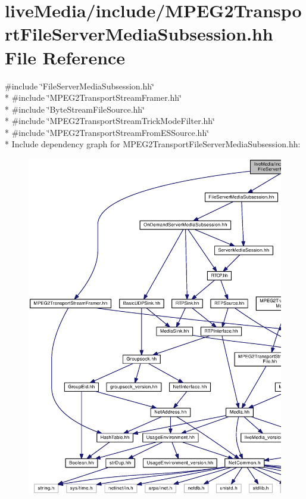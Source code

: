 \section{live\+Media/include/\+M\+P\+E\+G2\+Transport\+File\+Server\+Media\+Subsession.hh File Reference}
\label{MPEG2TransportFileServerMediaSubsession_8hh}
{\ttfamily \#include \char`\"{}File\+Server\+Media\+Subsession.\+hh\char`\"{}}\\*
{\ttfamily \#include \char`\"{}M\+P\+E\+G2\+Transport\+Stream\+Framer.\+hh\char`\"{}}\\*
{\ttfamily \#include \char`\"{}Byte\+Stream\+File\+Source.\+hh\char`\"{}}\\*
{\ttfamily \#include \char`\"{}M\+P\+E\+G2\+Transport\+Stream\+Trick\+Mode\+Filter.\+hh\char`\"{}}\\*
{\ttfamily \#include \char`\"{}M\+P\+E\+G2\+Transport\+Stream\+From\+E\+S\+Source.\+hh\char`\"{}}\\*
Include dependency graph for M\+P\+E\+G2\+Transport\+File\+Server\+Media\+Subsession.\+hh\+:
\nopagebreak
\begin{figure}[H]
\begin{center}
\leavevmode
\includegraphics[width=350pt]{MPEG2TransportFileServerMediaSubsession_8hh__incl}
\end{center}
\end{figure}

